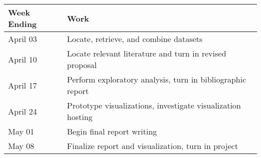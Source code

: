 \documentclass[a4paper,11pt]{article}
\begin{document}
\begin{center}
\begin{tabular}{| l | l | }
  \hline	
      Week Ending & Work  \\  \hline \hline
      April 03 &  Locate, retrieve, and combine datasets \\ \hline
      April 10 &  Locate relevant literature and turn in revised proposal \\ \hline
      April 17 &  Perform exploratory analysis, turn in bibliographic report \\ \hline
      April 24 &  Prototype visualizations, investigate visualization hosting \\ \hline
      May 01 &  Begin final report writing  \\ \hline
      May 08 &  Finalize report and visualization, turn in project\\ \hline
\end{tabular} \\
\end{center}


\end{document}
